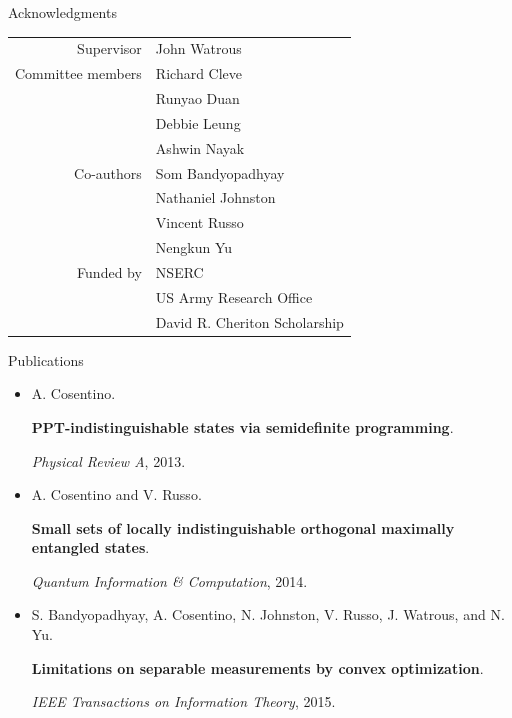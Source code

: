 \documentclass{beamer}
\begin{document}
    \begin{frame}{Acknowledgments}
        \begin{center}
            \begin{tabular}{ r L }
                Supervisor & John Watrous \\[1em]
                Committee members & Richard Cleve \\
                                  & Runyao Duan \\
                                  & Debbie Leung \\
                                  & Ashwin Nayak \\[1em]
                Co-authors & Som Bandyopadhyay \\
                           & Nathaniel Johnston \\
                           & Vincent Russo \\
                           & Nengkun Yu \\[1em]
                Funded by  & NSERC \\
                           & US Army Research Office \\
                           & David R. Cheriton Scholarship
            \end{tabular}
        \end{center}
    \end{frame}

    \begin{frame}{Publications}
    
        \begin{itemize}
        \setlength\itemsep{1em}
            \item 
            A. Cosentino. 

            \textbf{PPT-indistinguishable states via semidefinite programming}. 
            
            \textit{Physical Review A}, 2013.

            \item
            A. Cosentino and V. Russo.

            \textbf{Small sets of locally indistinguishable orthogonal maximally entangled states}. 
            
            \textit{Quantum Information \& Computation},  2014.

            \item 
            S. Bandyopadhyay, A. Cosentino, N. Johnston, V. Russo, J. Watrous, and N. Yu. 
            
            \textbf{Limitations on separable measurements by convex optimization}. 
            
            \textit{IEEE Transactions on Information Theory}, 2015.
        \end{itemize}

    \end{frame}
\end{document}

